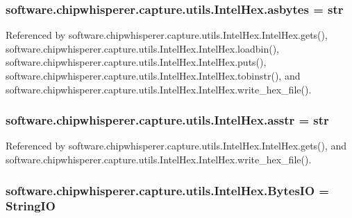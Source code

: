 \subsubsection[{asbytes}]{\setlength{\rightskip}{0pt plus 5cm}software.\+chipwhisperer.\+capture.\+utils.\+Intel\+Hex.\+asbytes = str}\label{namespacesoftware_1_1chipwhisperer_1_1capture_1_1utils_1_1IntelHex_a7f086f0677c4876409244a91e386b8cc}


Referenced by software.\+chipwhisperer.\+capture.\+utils.\+Intel\+Hex.\+Intel\+Hex.\+gets(), software.\+chipwhisperer.\+capture.\+utils.\+Intel\+Hex.\+Intel\+Hex.\+loadbin(), software.\+chipwhisperer.\+capture.\+utils.\+Intel\+Hex.\+Intel\+Hex.\+puts(), software.\+chipwhisperer.\+capture.\+utils.\+Intel\+Hex.\+Intel\+Hex.\+tobinstr(), and software.\+chipwhisperer.\+capture.\+utils.\+Intel\+Hex.\+Intel\+Hex.\+write\+\_\+hex\+\_\+file().

\hypertarget{namespacesoftware_1_1chipwhisperer_1_1capture_1_1utils_1_1IntelHex_a32eb6deeafe6dba1f76d94543cff7528}{}
\subsubsection[{asstr}]{\setlength{\rightskip}{0pt plus 5cm}software.\+chipwhisperer.\+capture.\+utils.\+Intel\+Hex.\+asstr = str}\label{namespacesoftware_1_1chipwhisperer_1_1capture_1_1utils_1_1IntelHex_a32eb6deeafe6dba1f76d94543cff7528}


Referenced by software.\+chipwhisperer.\+capture.\+utils.\+Intel\+Hex.\+Intel\+Hex.\+gets(), and software.\+chipwhisperer.\+capture.\+utils.\+Intel\+Hex.\+Intel\+Hex.\+write\+\_\+hex\+\_\+file().

\hypertarget{namespacesoftware_1_1chipwhisperer_1_1capture_1_1utils_1_1IntelHex_a9a096078c0304b8899258794dfdd8d29}{}
\subsubsection[{Bytes\+I\+O}]{\setlength{\rightskip}{0pt plus 5cm}software.\+chipwhisperer.\+capture.\+utils.\+Intel\+Hex.\+Bytes\+I\+O = String\+I\+O}\label{namespacesoftware_1_1chipwhisperer_1_1capture_1_1utils_1_1IntelHex_a9a096078c0304b8899258794dfdd8d29}
\hypertarget{namespacesoftware_1_1chipwhisperer_1_1capture_1_1utils_1_1IntelHex_a34682ee317fa430599b7c44473a9f2c8}{}
